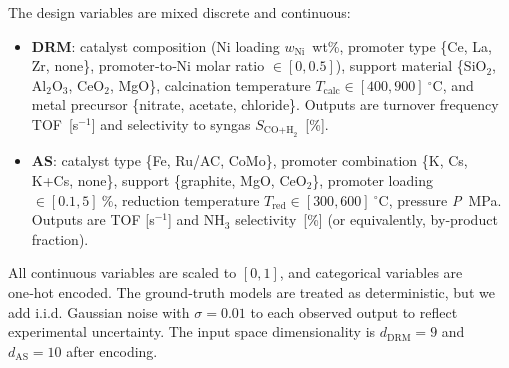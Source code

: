 \documentclass{article}
\begin{document}
The design variables are mixed discrete and continuous:
\begin{itemize}
    \item \textbf{DRM}: catalyst composition (Ni loading $w_{\text{Ni}}$\in[0.5,20]~wt\%, promoter type \{Ce, La, Zr, none\}, promoter‑to‑Ni molar ratio $\in[0,0.5]$), support material \{SiO$_2$, Al$_2$O$_3$, CeO$_2$, MgO\}, calcination temperature $T_{\text{calc}}\in[400,900]~^\circ$C, and metal precursor \{nitrate, acetate, chloride\}. Outputs are turnover frequency TOF~[s$^{-1}$] and selectivity to syngas $S_{\text{CO+H}_2}$~[\%].
    \item \textbf{AS}: catalyst type \{Fe, Ru/AC, CoMo\}, promoter combination \{K, Cs, K+Cs, none\}, support \{graphite, MgO, CeO$_2$\}, promoter loading $\in[0.1,5]~\%$, reduction temperature $T_{\text{red}}\in[300,600]~^\circ$C, pressure \emph{P}\in[1,10]~MPa. Outputs are TOF [s$^{-1}$] and NH$_3$ selectivity~[\%] (or equivalently, by‑product fraction).
\end{itemize}
All continuous variables are scaled to $[0,1]$, and categorical variables are one‑hot encoded. The ground‑truth models are treated as deterministic, but we add i.i.d. Gaussian noise with $\sigma=0.01$ to each observed output to reflect experimental uncertainty. The input space dimensionality is $d_{\text{DRM}}=9$ and $d_{\text{AS}}=10$ after encoding.
\end{document}
